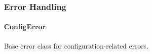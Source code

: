 \begin{Shaded}
\begin{Highlighting}[]
\OperatorTok{:} \OperatorTok{;}
 \OperatorTok{;}
\OperatorTok{:} \NormalTok{) }\KeywordTok{=\textgreater{}} \OperatorTok{;}
\NormalTok{\}}
\end{Highlighting}
\end{Shaded}

\hypertarget{error-handling-1}{%
\subsubsection{Error Handling}\label{error-handling-1}}

\hypertarget{configerror}{%
\paragraph{ConfigError}\label{configerror}}

Base error class for configuration-related errors.

